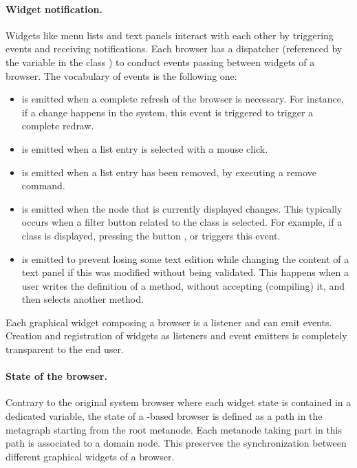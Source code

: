 \documentclass[a4paper,10pt,twoside]{book}
\begin{document}
\paragraph{Widget notification.} Widgets like menu lists and text panels interact with each other by triggering events and receiving notifications. Each browser has a dispatcher (referenced by the variable  in the class ) to conduct events passing between widgets of a browser. The vocabulary of events is the following one:
\begin{itemize}
\item {} is emitted when a complete refresh of the browser is necessary. For instance, if a change happens in the system, this event is triggered to trigger a complete redraw.

\item {} is emitted when a list entry is selected with a mouse click. 

\item {} is emitted when a list entry has been removed, \eg by executing a remove command. 

\item {} is emitted when the node that is currently displayed changes. This typically occurs when a filter button related to the class is selected. For example, if a class is displayed, pressing the button ,  or  triggers this event.

\item {} is emitted to prevent losing some text edition while changing the content of a text panel if this was modified without being validated. This happens when a user writes the definition of a method, without accepting (\ie compiling) it, and then selects another method.
\end{itemize}

Each graphical widget composing a browser is a listener and can emit events. Creation and registration of widgets as listeners and event emitters is completely transparent to the end user.

\paragraph{State of the browser.} Contrary to the original \pharo system browser where each widget state is contained in a dedicated variable, the state of a \obf-based browser is defined as a path in the metagraph starting from the root metanode. Each metanode taking part in this path is associated to a domain node. This preserves the synchronization between different graphical widgets of a browser.
\end{document}
